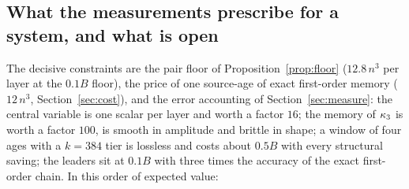 \subsection{What the measurements prescribe for a system, and what is open}
The decisive constraints are the pair floor of Proposition~\ref{prop:floor} ($12.8\,n^3$ per layer at the $0.1B$ floor),
the price of one source-age of exact first-order memory ($12\,n^3$, Section~\ref{sec:cost}), and the error
accounting of Section~\ref{sec:measure}: the central variable is one scalar per layer and worth a factor $16$; the
memory of $\kappa_3$ is worth a factor $100$, is smooth in amplitude and brittle in shape; a window of four ages with a
$k=384$ tier is lossless and costs about $0.5B$ with every structural saving; the leaders sit at $0.1B$ with three
times the accuracy of the exact first-order chain. In this order of expected value:
